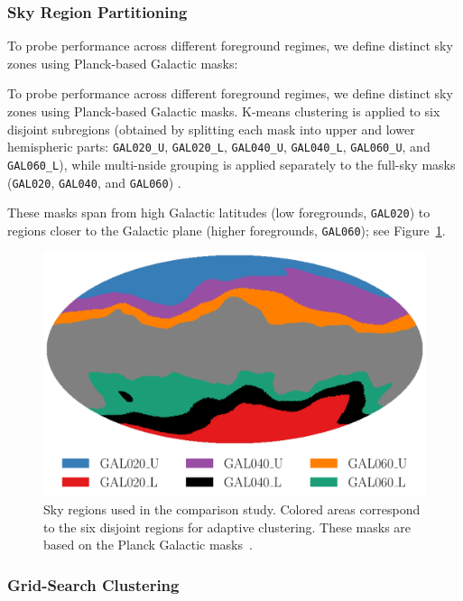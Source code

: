 \documentclass[fleqn,usenatbib]{mnras}
\begin{document}
\subsubsection*{Sky Region Partitioning}

To probe performance across different foreground regimes, we define distinct sky zones using Planck-based Galactic masks:

To probe performance across different foreground regimes, we define distinct sky zones using Planck-based Galactic masks. K-means clustering is applied to six disjoint subregions (obtained by splitting each mask into upper and lower hemispheric parts: \texttt{GAL020\_U}, \texttt{GAL020\_L}, \texttt{GAL040\_U}, \texttt{GAL040\_L}, \texttt{GAL060\_U}, and \texttt{GAL060\_L}), while multi-nside grouping is applied separately to the full-sky masks (\texttt{GAL020}, \texttt{GAL040}, and \texttt{GAL060}) \citep{Planck2018_Overview}.

These masks span from high Galactic latitudes (low foregrounds, \texttt{GAL020}) to regions closer to the Galactic plane (higher foregrounds, \texttt{GAL060}); see Figure~\ref{fig:mask_layout}.


\begin{figure}
    \centering
    \includegraphics[width=\linewidth]{figures/sky_region_mask_zones.pdf}
    \caption{
    Sky regions used in the comparison study. 
    Colored areas correspond to the six disjoint regions for adaptive clustering.
    These masks are based on the Planck Galactic masks~\citep{Planck2015Galactic}.
    }
    \label{fig:mask_layout}
\end{figure}

\subsubsection*{Grid-Search Clustering}
\end{document}
